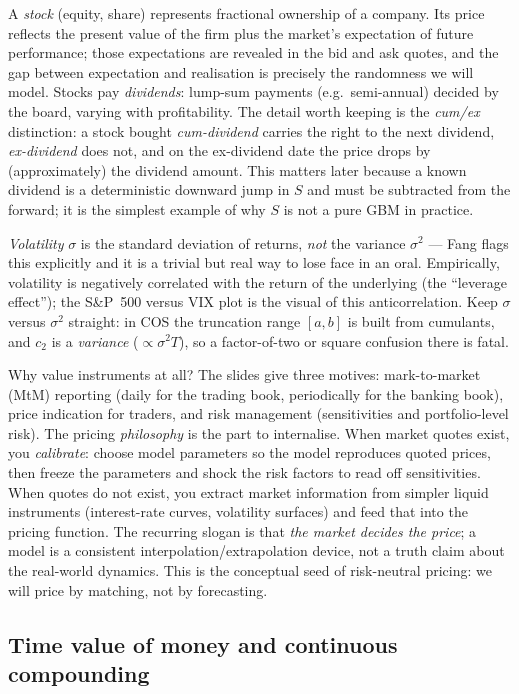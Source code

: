\documentclass[11pt]{article}
\begin{document}
A \emph{stock} (equity, share) represents fractional ownership of a company. Its price reflects the present value of the firm plus the market's expectation of future performance; those expectations are revealed in the bid and ask quotes, and the gap between expectation and realisation is precisely the randomness we will model. Stocks pay \emph{dividends}: lump-sum payments (e.g.\ semi-annual) decided by the board, varying with profitability. The detail worth keeping is the \emph{cum/ex} distinction: a stock bought \emph{cum-dividend} carries the right to the next dividend, \emph{ex-dividend} does not, and on the ex-dividend date the price drops by (approximately) the dividend amount. This matters later because a known dividend is a deterministic downward jump in $S$ and must be subtracted from the forward; it is the simplest example of why $S$ is not a pure GBM in practice.

\emph{Volatility} $\sigma$ is the standard deviation of returns, \emph{not} the variance $\sigma^2$ --- Fang flags this explicitly and it is a trivial but real way to lose face in an oral. Empirically, volatility is negatively correlated with the return of the underlying (the ``leverage effect''); the S\&P~500 versus VIX plot is the visual of this anticorrelation. Keep $\sigma$ versus $\sigma^2$ straight: in COS the truncation range $[a,b]$ is built from cumulants, and $c_2$ is a \emph{variance} ($\propto\sigma^2 T$), so a factor-of-two or square confusion there is fatal.

Why value instruments at all? The slides give three motives: mark-to-market (MtM) reporting (daily for the trading book, periodically for the banking book), price indication for traders, and risk management (sensitivities and portfolio-level risk). The pricing \emph{philosophy} is the part to internalise. When market quotes exist, you \emph{calibrate}: choose model parameters so the model reproduces quoted prices, then freeze the parameters and shock the risk factors to read off sensitivities. When quotes do not exist, you extract market information from simpler liquid instruments (interest-rate curves, volatility surfaces) and feed that into the pricing function. The recurring slogan is that \emph{the market decides the price}; a model is a consistent interpolation/extrapolation device, not a truth claim about the real-world dynamics. This is the conceptual seed of risk-neutral pricing: we will price by matching, not by forecasting.

\subsection{Time value of money and continuous compounding}
\end{document}
